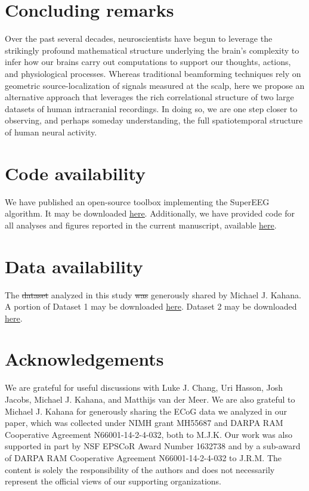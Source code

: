 \documentclass[11pt]{article}
\providecommand{\DIFaddtex}[1]{{\protect\color{blue}\uwave{#1}}} %
\providecommand{\DIFdeltex}[1]{{\protect\color{red}\sout{#1}}}                      %
\providecommand{\DIFaddbegin}{} %
\providecommand{\DIFaddend}{} %
\providecommand{\DIFdelbegin}{} %
\providecommand{\DIFdelend}{} %
\providecommand{\DIFadd}[1]{\texorpdfstring{\DIFaddtex{#1}}{#1}} %
\providecommand{\DIFdel}[1]{\texorpdfstring{\DIFdeltex{#1}}{}} %
\newcommand{\DIFscaledelfig}{0.5}
\newlength{\DIFdelgraphicswidth} %
\newlength{\DIFdelgraphicsheight} %
\newcommand{\DIFaddincludegraphics}[2][]{{\color{blue}\fbox{\DIFOincludegraphics[#1]{#2}}}} %
\newcommand{\DIFdelincludegraphics}[2][]{%
\sbox{\DIFdelgraphicsbox}{\DIFOincludegraphics[#1]{#2}}%
\settoboxwidth{\DIFdelgraphicswidth}{\DIFdelgraphicsbox} %
\settoboxtotalheight{\DIFdelgraphicsheight}{\DIFdelgraphicsbox} %
\scalebox{\DIFscaledelfig}{%
\parbox[b]{\DIFdelgraphicswidth}{\usebox{\DIFdelgraphicsbox}\\[-\baselineskip] \rule{\DIFdelgraphicswidth}{0em}}\llap{\resizebox{\DIFdelgraphicswidth}{\DIFdelgraphicsheight}{%
\setlength{\unitlength}{\DIFdelgraphicswidth}%
\begin{picture}(1,1)%
\thicklines\linethickness{2pt} %
{\color[rgb]{1,0,0}\put(0,0){\framebox(1,1){}}}%
{\color[rgb]{1,0,0}\put(0,0){\line( 1,1){1}}}%
{\color[rgb]{1,0,0}\put(0,1){\line(1,-1){1}}}%
\end{picture}%
}\hspace*{3pt}}} %
} %
\DeclareRobustCommand{\DIFaddbegin}{\DIFOaddbegin \let\includegraphics\DIFaddincludegraphics} %
\DeclareRobustCommand{\DIFaddend}{\DIFOaddend \let\includegraphics\DIFOincludegraphics} %
\DeclareRobustCommand{\DIFdelbegin}{\DIFOdelbegin \let\includegraphics\DIFdelincludegraphics} %
\DeclareRobustCommand{\DIFdelend}{\DIFOaddend \let\includegraphics\DIFOincludegraphics} %
\begin{document}
\section*{Concluding remarks}
Over the past several decades, neuroscientists
have begun to leverage the strikingly profound mathematical structure underlying
the brain's complexity to infer how our brains carry out computations to support
our thoughts, actions, and physiological processes.  Whereas traditional
beamforming techniques rely on geometric source-localization of signals measured
at the scalp, here we propose an alternative approach that leverages the rich
correlational structure of two large datasets of human intracranial recordings.
In doing so, we are one step closer to observing, and perhaps someday
understanding, the full spatiotemporal structure of human neural activity.

\section*{Code availability}
We have published an open-source toolbox
implementing the SuperEEG algorithm.  It may be downloaded
\href{https://supereeg.readthedocs.io/en/latest/}{\underline{here}}.
Additionally, we have provided code for all analyses and figures reported in the
current manuscript, available
\href{https://github.com/ContextLab/supereeg_paper}{\underline{here}}.

\section*{Data availability}
The \DIFdelbegin \DIFdel{dataset }\DIFdelend \DIFaddbegin \DIFadd{datasets }\DIFaddend analyzed in this study \DIFdelbegin \DIFdel{was }\DIFdelend \DIFaddbegin \DIFadd{were }\DIFaddend generously shared by Michael
J. Kahana.  A portion of Dataset 1 may be downloaded
\href{http://memory.psych.upenn.edu/Request_EEG_access?paper=SedeEtal03}{\underline{here}}.
Dataset 2 may be downloaded
\href{http://memory.psych.upenn.edu/Request_EEG_access?paper=EzzyEtal17}{\underline{here}}.

\section*{Acknowledgements}
We are grateful for useful discussions with Luke J.
Chang, Uri Hasson, Josh Jacobs, Michael J. Kahana, and Matthijs van der Meer.
We are also grateful to Michael J. Kahana for generously sharing the ECoG data
we analyzed in our paper, which was collected under NIMH grant MH55687 and DARPA
RAM Cooperative Agreement N66001-14-2-4-032, both to M.J.K.  Our work was also
supported in part by NSF EPSCoR Award Number 1632738 and by a sub-award of DARPA
RAM Cooperative Agreement N66001-14-2-4-032 to J.R.M.  The content is solely the
responsibility of the authors and does not necessarily represent the official
views of our supporting organizations.
\end{document}
